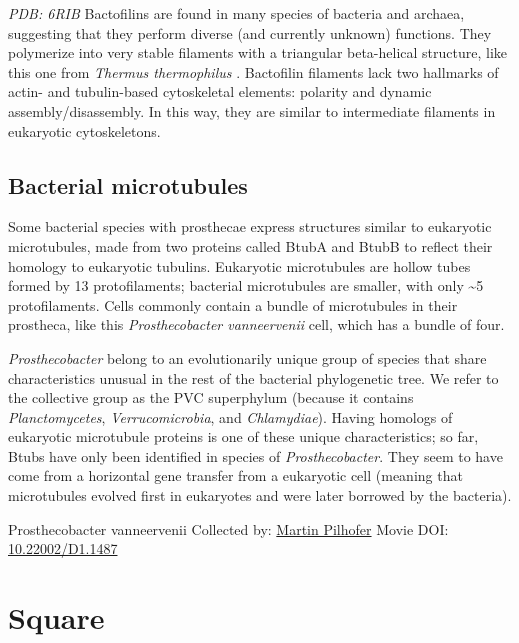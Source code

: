 \documentclass[]{tufte-book}
\begin{document}
\emph{PDB: 6RIB}
Bactofilins are found in many species of bacteria and archaea, suggesting that they perform diverse (and currently unknown) functions. They polymerize into very stable filaments with a triangular beta-helical structure, like this one from \emph{Thermus thermophilus} \citep{deng2019}. Bactofilin filaments lack two hallmarks of actin- and tubulin-based cytoskeletal elements: polarity and dynamic assembly/disassembly. In this way, they are similar to intermediate filaments in eukaryotic cytoskeletons.

\hypertarget{Bacterial_microtubules}{%
\subsection{Bacterial microtubules}\label{Bacterial_microtubules}}

Some bacterial species with prosthecae express structures similar to eukaryotic microtubules, made from two proteins called BtubA and BtubB to reflect their homology to eukaryotic tubulins. Eukaryotic microtubules are hollow tubes formed by 13 protofilaments; bacterial microtubules are smaller, with only \textasciitilde{}5 protofilaments. Cells commonly contain a bundle of microtubules in their prostheca, like this \emph{Prosthecobacter vanneervenii} cell, which has a bundle of four.

\emph{Prosthecobacter} belong to an evolutionarily unique group of species that share characteristics unusual in the rest of the bacterial phylogenetic tree. We refer to the collective group as the PVC superphylum (because it contains \emph{Planctomycetes}, \emph{Verrucomicrobia}, and \emph{Chlamydiae}). Having homologs of eukaryotic microtubule proteins is one of these unique characteristics; so far, Btubs have only been identified in species of \emph{Prosthecobacter}. They seem to have come from a horizontal gene transfer from a eukaryotic cell (meaning that microtubules evolved first in eukaryotes and were later borrowed by the bacteria).



\hypertarget{htmlwidget-6ddb0c2040ee464d4fe9}{}

\label{fig:3-6a}Prosthecobacter vanneervenii Collected by: \protect\hyperlink{martin_pilhofer}{Martin Pilhofer} Movie DOI: \href{https://doi.org/10.22002/D1.1487}{10.22002/D1.1487}

\hypertarget{square}{%
\section{Square}\label{square}}
\end{document}
